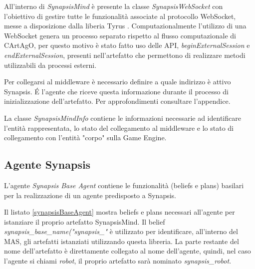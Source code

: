 

\medskip

All'interno di \textit{SynapsisMind} è presente la classe \textit{SynapsisWebSocket} con l'obiettivo di gestire tutte le funzionalità associate al protocollo WebSocket, messe a disposizione dalla liberia Tyrus \cite{tyrus}. Computazionalmente l'utilizzo di una WebSocket genera un processo separato rispetto al flusso computazionale di CArtAgO, per questo motivo è stato fatto uso delle API, \textit{beginExternalSession} e \textit{endExternalSession}, presenti nell'artefatto che permettono di realizzare metodi utilizzabili da processi esterni.

\medskip

Per collegarsi al middleware è necessario definire a quale indirizzo è attivo Synapsis. \'E l'agente che riceve questa informazione durante il processo di inizializzazione dell'artefatto. Per approfondimenti consultare l'appendice. 

\medskip

La classe \textit{SynapsisMindInfo} contiene le informazioni necessarie ad identificare l'entità rappresentata, lo stato del collegamento al middleware e lo stato di collegamento con l'entità "corpo" sulla Game Engine.

\subsection{Agente Synapsis}

L'agente \textit{Synapsis Base Agent} contiene le funzionalità (beliefs e plans) basilari per la realizzazione di un agente predisposto a Synapsis.



Il listato \ref{synapsisBaseAgent} mostra beliefs e plans necessari all'agente per istanziare il proprio artefatto SynapsisMind. Il belief \textit{synapsis\_base\_name("synapsis\_"} è utilizzato per identificare, all'interno del MAS, gli artefatti istanziati utilizzando questa libreria. La parte restante del nome dell'artefatto è direttamente collegato al nome dell'agente, quindi, nel caso l'agente si chiami \textit{robot}, il proprio artefatto sarà nominato \textit{synapsis\_robot}.

\medskip

